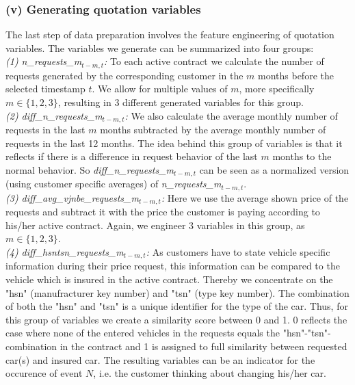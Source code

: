 \documentclass[12pt,titlepage]{article}
\begin{document}
\subsubsection*{(v) Generating quotation variables}
The last step of data preparation involves the feature engineering of quotation variables. The variables we generate can be summarized into four groups: \\

\noindent
\textit{(1) n\_requests\_m$_{t - m, t}$:} To each active contract we calculate the number of requests generated by the corresponding customer in the $m$ months before the selected timestamp $t$. We allow for multiple values of $m$, more specifically $m \in \{ 1, 2, 3\}$, resulting in 3 different generated variables for this group. \\

\noindent
\textit{(2) diff\_n\_requests\_m$_{t - m, t}$:} We also calculate the average monthly number of requests in the last $m$ months subtracted by the average monthly number of requests in the last 12 months. The idea behind this group of variables is that it reflects if there is a difference in request behavior of the last $m$ months to the normal behavior. So \textit{diff\_n\_requests\_m$_{t - m, t}$} can be seen as a normalized version (using customer specific averages) of \textit{n\_requests\_m$_{t - m, t}$}. \\

\noindent
\textit{(3) diff\_avg\_vjnbe\_requests\_m$_{t - m, t}$:} Here we use the average shown price of the requests and subtract it with the price the customer is paying according to his/her active contract. Again, we engineer 3 variables in this group, as $m \in \{ 1, 2, 3\}$. \\

\noindent
\textit{(4) diff\_hsntsn\_requests\_m$_{t - m, t}$:} As customers have to state vehicle specific information during their price request, this information can be compared to the vehicle which is insured in the active contract. Thereby we concentrate on the "hsn" (manufracturer key number) and "tsn" (type key number). The combination of both the "hsn" and "tsn" is a unique identifier for the type of the car. Thus, for this group of variables we create a similarity score between 0 and 1. 0 reflects the case where none of the entered vehicles in the requests equals the "hsn"-"tsn"-combination in the contract and 1 is assigned to full similarity between requested car(s) and insured car. The resulting variables can be an indicator for the occurence of event $N$, i.e. the customer thinking about changing his/her car. \\
\end{document}
